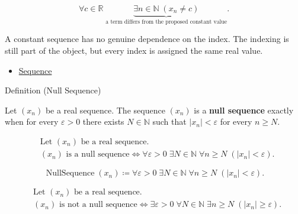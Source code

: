 \begin{remark*}
\[
\forall c \in \mathbb{R}\;
\underbrace{\exists n \in \mathbb{N}\;(x_n \neq c)}
_{\text{a term differs from the proposed constant value}}.
\]
\end{remark*}

\begin{remark*}[Interpretation]
A constant sequence has no genuine dependence on the index. The indexing is
still part of the object, but every index is assigned the same real value.
\end{remark*}

\begin{dependencies}
\begin{itemize}
  \item \hyperref[def:sequence]{Sequence}
\end{itemize}
\end{dependencies}


\begin{definitionbox}{Definition (Null Sequence)}
\begin{definition}
\label{def:null-sequence}
Let $(x_n)$ be a real sequence. The sequence $(x_n)$ is a
\textbf{null sequence} exactly when for every $\varepsilon > 0$ there exists
$N \in \mathbb{N}$ such that $|x_n| < \varepsilon$ for every $n \ge N$.
\end{definition}
\end{definitionbox}

\begin{remark*}
\[
\begin{aligned}
&\text{Let } (x_n) \text{ be a real sequence.}\\
&(x_n) \text{ is a null sequence}
\Longleftrightarrow
\forall \varepsilon > 0\;
\exists N \in \mathbb{N}\;
\forall n \ge N\;(|x_n| < \varepsilon).
\end{aligned}
\]
\end{remark*}

\begin{remark*}
\[
\operatorname{NullSequence}(x_n)
\coloneqq
\forall \varepsilon > 0\;
\exists N \in \mathbb{N}\;
\forall n \ge N\;(|x_n| < \varepsilon).
\]
\end{remark*}

\begin{remark*}
\[
\begin{aligned}
&\text{Let } (x_n) \text{ be a real sequence.}\\
&(x_n) \text{ is not a null sequence}
\Longleftrightarrow
\exists \varepsilon > 0\;
\forall N \in \mathbb{N}\;
\exists n \ge N\;(|x_n| \ge \varepsilon).
\end{aligned}
\]
\end{remark*}


